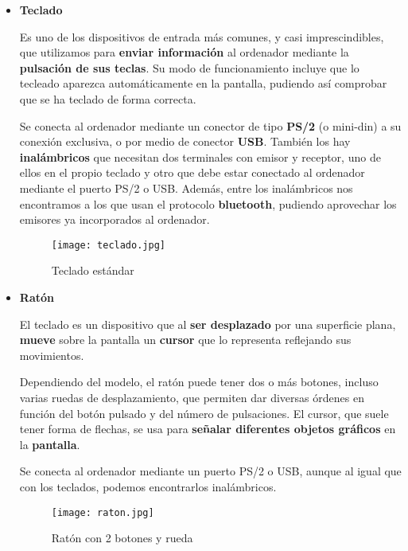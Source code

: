\begin{itemize}
    \item \textbf{Teclado}

    Es uno de los dispositivos de entrada más comunes, y casi imprescindibles, que utilizamos para \textbf{enviar información} al ordenador mediante la \textbf{pulsación de sus teclas}. Su modo de funcionamiento incluye que lo tecleado aparezca automáticamente en la pantalla, pudiendo así comprobar que se ha teclado de forma correcta.

    Se conecta al ordenador mediante un conector de tipo \textbf{PS/2} (o mini-din) a su conexión exclusiva, o por medio de conector \textbf{USB}. También los hay \textbf{inalámbricos} que necesitan dos terminales con emisor y receptor, uno de ellos en el propio teclado y otro que debe estar conectado al ordenador mediante el puerto PS/2 o USB. Además, entre los inalámbricos nos encontramos a los que usan el protocolo \textbf{bluetooth}, pudiendo aprovechar los emisores ya incorporados al ordenador.

    \begin{figure}[ht]
        \centering
        \texttt{[image: teclado.jpg]}
        \caption{Teclado estándar}
    \end{figure}

    \item \textbf{Ratón}

    El teclado es un dispositivo que al \textbf{ser desplazado} por una superficie plana, \textbf{mueve} sobre la pantalla un \textbf{cursor} que lo representa reflejando sus movimientos.

    Dependiendo del modelo, el ratón puede tener dos o más botones, incluso varias ruedas de desplazamiento, que permiten dar diversas órdenes en función del botón pulsado y del número de pulsaciones.  El cursor, que suele tener forma de flechas, se usa para \textbf{señalar diferentes objetos gráficos} en la \textbf{pantalla}.

    Se conecta al ordenador mediante un puerto PS/2 o USB, aunque al igual que con los teclados, podemos encontrarlos inalámbricos.

    \vspace{4ex}

    \begin{figure}[ht]
        \centering
        \texttt{[image: raton.jpg]}
        \caption{Ratón con 2 botones y rueda}
    \end{figure}



\end{itemize}
